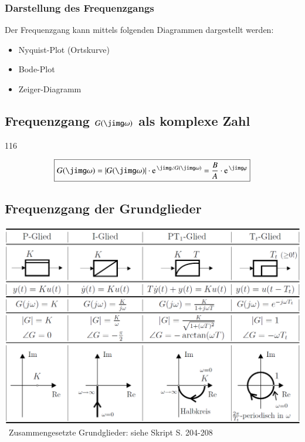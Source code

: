 \subsubsection*{Darstellung des Frequenzgangs}

Der Frequenzgang kann mittels folgenden Diagrammen dargestellt werden: 

\begin{itemize}
    \item Nyquist-Plot (Ortskurve)
    \item Bode-Plot
    \item Zeiger-Diagramm %
\end{itemize}


\subsection[Frequenzgang G(j omega) als komplexe Zahl]{Frequenzgang $G(\jimg \omega)$ als komplexe Zahl}{116}

\vspace{-0.3cm} %
$$ \boxed{ G(\jimg \omega) =  \abs{G(\jimg \omega)} \cdot \e^{\jimg \angle G(\jimg \omega)} = \frac{B}{A} \cdot \e^{\jimg  \varphi} } $$


\subsection{Frequenzgang der Grundglieder}

\includegraphics[width=\columnwidth]{images/frequenzgaenge_grundglieder.png} \\
\textrightarrow\ Zusammengesetzte Grundglieder: siehe Skript S. 204-208



